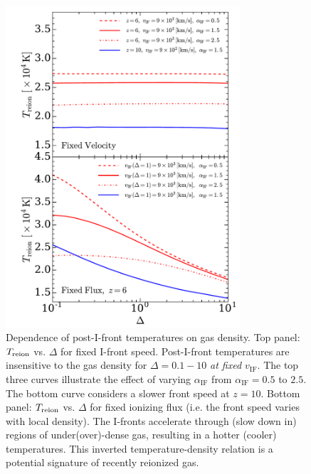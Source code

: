 \documentclass[twocolumn]{aastex62}
\newcommand{\Treion}{T_{\rm reion}}
\newcommand{\vIF}{v_{\mathrm{IF}}}
\newcommand{\spec}{\alpha_{\mathrm{IF}}}
\begin{document}
\begin{figure}
\includegraphics[width=8.7cm]{fig4.pdf}
\caption{Dependence of post-I-front temperatures on gas density.  Top panel: $\Treion$ vs. $\Delta$ for fixed I-front speed.  Post-I-front temperatures are insensitive to the gas density for $\Delta =0.1-10$ {\it at fixed $\vIF$}.  The top three curves illustrate the effect of varying $\spec$ from $\spec = 0.5$ to $2.5$.  The bottom curve considers a slower front speed at $z=10$.  Bottom panel: $\Treion$ vs. $\Delta$ for fixed ionizing flux (i.e. the front speed varies with local density).  The I-fronts accelerate through (slow down in) regions of under(over)-dense gas, resulting in a hotter (cooler) temperatures.  This inverted temperature-density relation is a potential signature of recently reionized gas. }
\label{fig:Treion_density}
\end{figure}
\end{document}
